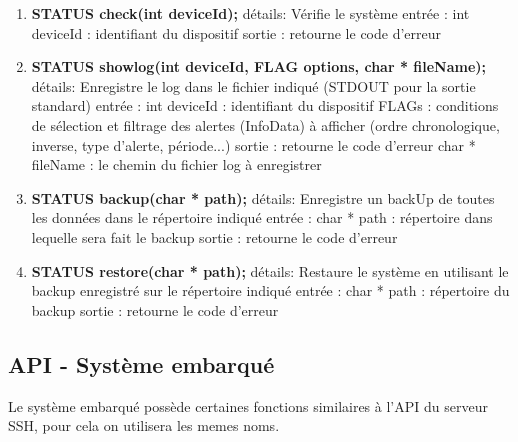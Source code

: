 \begin{enumerate}
\item \textbf{STATUS check(int deviceId);}
détails:
		Vérifie le système
entrée :
		int deviceId : identifiant du dispositif
sortie :
		retourne le code d'erreur

\item \textbf{STATUS showlog(int deviceId, FLAG options, char * fileName);}
détails:
		Enregistre le log dans le fichier indiqué (STDOUT pour la sortie standard)
entrée :
		int deviceId : identifiant du dispositif
		FLAGs : conditions de sélection et filtrage des alertes (InfoData) à afficher (ordre chronologique, inverse, type d'alerte, période...)
sortie :
		retourne le code d'erreur
		char * fileName : le chemin du fichier log à enregistrer

\item \textbf{STATUS backup(char * path);}
détails:
		Enregistre un backUp de toutes les données dans le répertoire indiqué
entrée :
		char * path : répertoire dans lequelle sera fait le backup
sortie :
		retourne le code d'erreur

\item \textbf{STATUS restore(char * path);}
détails:
		Restaure le système en utilisant le backup enregistré sur le répertoire indiqué
entrée :
		char * path : répertoire du backup
sortie :
		retourne le code d'erreur

\end{enumerate}


\subsection{API - Système embarqué}

Le système embarqué possède certaines fonctions similaires à l'API du serveur 
SSH, pour cela on utilisera les memes noms.

